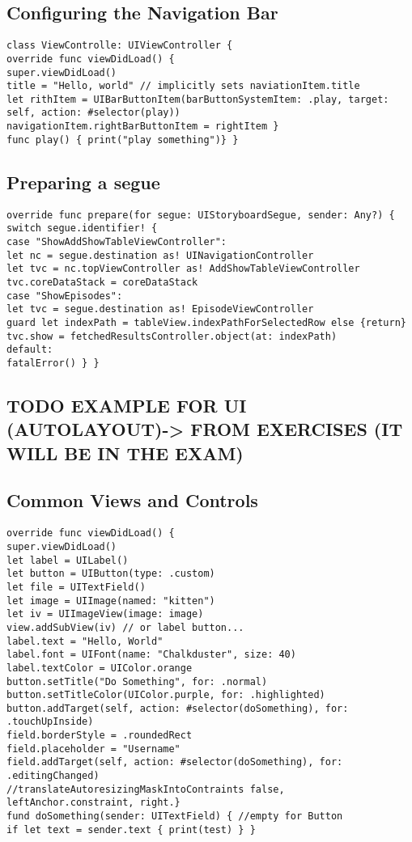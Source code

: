\subsection{Configuring the Navigation Bar}
\begin{lstlisting}
class ViewControlle: UIViewController {
override func viewDidLoad() {
super.viewDidLoad()
title = "Hello, world" // implicitly sets naviationItem.title
let rithItem = UIBarButtonItem(barButtonSystemItem: .play, target: self, action: #selector(play))
navigationItem.rightBarButtonItem = rightItem }
func play() { print("play something")} }
\end{lstlisting}

\subsection{Preparing a segue}
\begin{lstlisting}
override func prepare(for segue: UIStoryboardSegue, sender: Any?) {
switch segue.identifier! {
case "ShowAddShowTableViewController":
let nc = segue.destination as! UINavigationController
let tvc = nc.topViewController as! AddShowTableViewController
tvc.coreDataStack = coreDataStack
case "ShowEpisodes":
let tvc = segue.destination as! EpisodeViewController
guard let indexPath = tableView.indexPathForSelectedRow else {return}
tvc.show = fetchedResultsController.object(at: indexPath)
default:
fatalError() } }
\end{lstlisting}


\subsection{TODO EXAMPLE FOR UI (AUTOLAYOUT)-> FROM EXERCISES (IT WILL BE IN THE EXAM)}


\subsection{Common Views and Controls}
\begin{lstlisting}
override func viewDidLoad() {
super.viewDidLoad()
let label = UILabel()
let button = UIButton(type: .custom)
let file = UITextField()
let image = UIImage(named: "kitten")
let iv = UIImageView(image: image)
view.addSubView(iv) // or label button...
label.text = "Hello, World"
label.font = UIFont(name: "Chalkduster", size: 40)
label.textColor = UIColor.orange
button.setTitle("Do Something", for: .normal)
button.setTitleColor(UIColor.purple, for: .highlighted)
button.addTarget(self, action: #selector(doSomething), for: .touchUpInside)
field.borderStyle = .roundedRect
field.placeholder = "Username"
field.addTarget(self, action: #selector(doSomething), for: .editingChanged)
//translateAutoresizingMaskIntoContraints false, leftAnchor.constraint, right.}
fund doSomething(sender: UITextField) { //empty for Button
if let text = sender.text { print(test) } }
\end{lstlisting}

